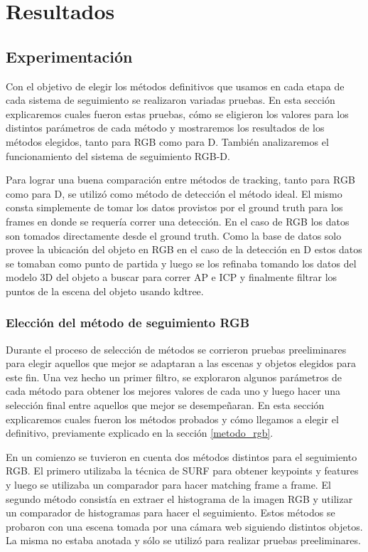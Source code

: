 \chapter{Resultados}

\section{Experimentación}
Con el objetivo de elegir los métodos definitivos que usamos en cada etapa de cada sistema de seguimiento se realizaron variadas pruebas. En esta sección explicaremos cuales fueron estas pruebas, cómo se eligieron los valores para los distintos parámetros de cada método y mostraremos los resultados de los métodos elegidos, tanto para RGB como para D. También analizaremos el funcionamiento del sistema de seguimiento RGB-D.

Para lograr una buena comparación entre métodos de tracking, tanto para RGB como para D, se utilizó como método de detección el método ideal. El mismo consta simplemente de tomar los datos provistos por el ground truth para los frames en donde se requería correr una detección. En el caso de RGB los datos son tomados directamente desde el ground truth. Como la base de datos solo provee la ubicación del objeto en RGB en el caso de la detección en D estos datos se tomaban como punto de partida y luego se los refinaba tomando los datos del modelo 3D del objeto a buscar para correr AP e ICP y finalmente filtrar los puntos de la escena del objeto usando kdtree.

\subsection{Elección del método de seguimiento RGB}
Durante el proceso de selección de métodos se corrieron pruebas preeliminares para elegir aquellos que mejor se adaptaran a las escenas y objetos elegidos para este fin. Una vez hecho un primer filtro, se exploraron algunos parámetros de cada método para obtener los mejores valores de cada uno y luego hacer una selección final entre aquellos que mejor se desempeñaran. En esta sección explicaremos cuales fueron los métodos probados y cómo llegamos a elegir el definitivo, previamente explicado en la sección \ref{metodo_rgb}.

En un comienzo se tuvieron en cuenta dos métodos distintos para el seguimiento RGB. El primero utilizaba la técnica de SURF para obtener keypoints y features y luego se utilizaba un comparador para hacer matching frame a frame. El segundo método consistía en extraer el histograma de la imagen RGB y utilizar un comparador de histogramas para hacer el seguimiento. Estos métodos se probaron con una escena tomada por una cámara web siguiendo distintos objetos. La misma no estaba anotada y sólo se utilizó para realizar pruebas preeliminares.


